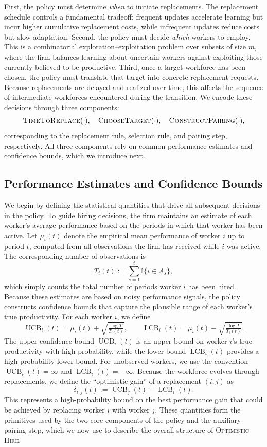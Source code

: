 \documentclass[opre,blindrev]{informs3}
\newcommand{\UCB}{\operatorname{UCB}}
\newcommand{\LCB}{\operatorname{LCB}}
\begin{document}
First, the policy must determine \emph{when} to initiate replacements. The replacement schedule controls a fundamental tradeoff: frequent updates accelerate learning but incur higher cumulative replacement costs, while infrequent updates reduce costs but slow adaptation. Second, the policy must decide \emph{which} workers to employ. This is a combinatorial exploration–exploitation problem over subsets of size \(m\), where the firm balances learning about uncertain workers against exploiting those currently believed to be productive. Third, once a target workforce has been chosen, the policy must translate that target into concrete replacement requests. Because replacements are delayed and realized over time, this affects the sequence of intermediate workforces encountered during the transition. We encode these decisions through three components:
\[\textsc{TimeToReplace}(\cdot),\quad \textsc{ChooseTarget}(\cdot),\quad \textsc{ConstructPairing}(\cdot),\]
corresponding to the replacement rule, selection rule, and pairing step, respectively. All three components rely on common performance estimates and confidence bounds, which we introduce next.

\vspace{-.1in}
\subsection{Performance Estimates and Confidence Bounds}
We begin by defining the statistical quantities that drive all subsequent decisions in the policy. To guide hiring decisions, the firm maintains an estimate of each worker's average performance based on the periods in which that worker has been active. Let \(\bar{\mu}_i(t)\) denote the empirical mean performance of worker \(i\) up to period \(t\), computed from all observations the firm has received while \(i\) was active. The corresponding number of observations is
\[
    T_i(t) := \sum_{s=1}^t \mathbb{I}\{  i \in A_s  \},
\]
which simply counts the total number of periods worker \(i\) has been hired. Because these estimates are based on noisy performance signals, the policy constructs confidence bounds that capture the plausible range of each worker's true productivity. For each worker \(i\), we define
\[
    \UCB_i(t) = \bar{\mu}_i(t) + \sqrt{\tfrac{\log T}{T_i(t)}},\qquad 
    \LCB_i(t) = \bar{\mu}_i(t) - \sqrt{\tfrac{\log T}{T_i(t)}}.
\]
The upper confidence bound \(\UCB_i(t)\) is an upper bound on worker \(i\)'s true productivity with high probability, while the lower bound \(\LCB_i(t)\) provides a high-probability lower bound. For unobserved workers, we use the convention \(\UCB_i(t)=\infty\) and \(\LCB_i(t)=-\infty\). Because the workforce evolves through replacements, we define the ``optimistic gain'' of a replacement \((i,j)\) as
\[\delta_{i,j}(t):= \UCB_j(t) - \LCB_i(t).\]
This represents a high-probability bound on the best performance gain that could be achieved by replacing worker \(i\) with worker \(j\). These quantities form the primitives used by the two core components of the policy and the auxiliary pairing step, which we now use to describe the overall structure of \textsc{Optimistic-Hire}.
\end{document}
